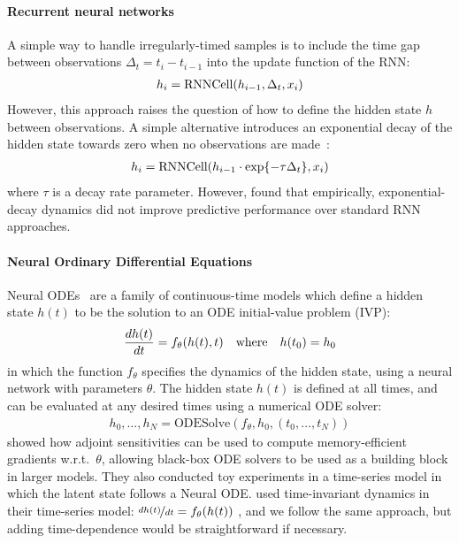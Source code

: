 \documentclass{article}
\begin{document}
\paragraph{Recurrent neural networks}
A simple way to handle irregularly-timed samples is to include the time gap between observations $\Delta_t = t_i - t_{i-1}$ into the update function of the RNN:
\begin{align}\label{eq:rnn_delta_t}
    h_i = \textnormal{RNNCell}(h_{i-1}, \Delta_t, x_i)
\end{align}
However, this approach raises the question of how to define the hidden state $h$ between observations.
A simple alternative introduces an exponential decay of the hidden state towards zero when no observations are made~\citep{che_sontag_2018, BRITS_2018, google_ehr_2018, mozer_2017}:
\begin{align}\label{eq:exp_decay}
    h_i = \textnormal{RNNCell}(h_{i-1} \cdot \exp\{-\tau \Delta_t \}, x_i)
\end{align}
where $\tau$ is a decay rate parameter.
However, \citet{mozer_2017} found that empirically, exponential-decay dynamics did not improve predictive performance over standard RNN approaches.

\paragraph{Neural Ordinary Differential Equations}Neural ODEs~\citep{NeuralODE} are a family of continuous-time models which define a hidden state $h(t)$ to be the solution to an ODE initial-value problem (IVP):
\begin{align}
    \frac{d h(t)}{dt} = f_\theta(h(t), t) \quad \textnormal{where} \quad h(t_0) = h_0
\end{align}
in which the function $f_\theta$ specifies the dynamics of the hidden state, using a neural network with parameters $\theta$. 
The hidden state $h(t)$ is defined at all times, and can be evaluated at any desired times using a numerical ODE solver:
\begin{align}\label{eq:latent_ode}
h_0,\dots,h_N = \text{ODESolve}(f_\theta, h_0, (t_0,\dots,t_N))
\end{align}
\citet{NeuralODE} showed how adjoint sensitivities can be used to compute memory-efficient gradients w.r.t.\ $\theta$, allowing black-box ODE solvers to be used as a building block in larger models.
They also conducted toy experiments in a time-series model in which the latent state follows a Neural ODE.
\citet{NeuralODE} used time-invariant dynamics in their time-series model: $\nicefrac{d h(t)}{dt} = f_\theta(h(t))$
, and we follow the same approach, but adding time-dependence would be straightforward if necessary.
\end{document}
